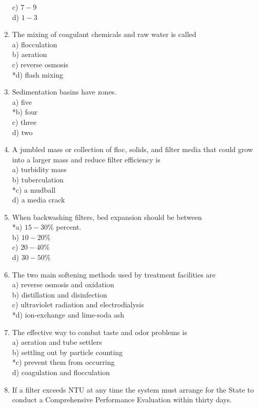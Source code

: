 \begin{enumerate}
c) $7-9$\\
d) $1-3$\\
\item The mixing of coagulant chemicals and raw water is called\\
a) flocculation\\
b) aeration\\
c) reverse osmosis\\
*d) flash mixing\\
\item Sedimentation basins have zones.\\
a) five\\
*b) four\\
c) three\\
d) two\\
\item A jumbled mass or collection of floc, solids, and filter media that could grow into a larger mass and reduce filter efficiency is\\
a) turbidity mass\\
b) tuberculation\\
*c) a mudball\\
d) a media crack\\
\item When backwashing filters, bed expansion should be between\\
*a) $15-30 \%$ percent.\\
b) $10-20 \%$\\
c) $20-40 \%$\\
d) $30-50 \%$\\
\item The two main softening methods used by treatment facilities are\\
a) reverse osmosis and oxidation\\
b) distillation and disinfection\\
c) ultraviolet radiation and electrodialysis\\
*d) ion-exchange and lime-soda ash\\
\item The effective way to combat taste and odor problems is\\
a) aeration and tube settlers\\
b) settling out by particle counting\\
*c) prevent them from occurring\\
d) coagulation and flocculation\\
\item If a filter exceeds NTU at any time the system must arrange for the State to conduct a Comprehensive Performance Evaluation within thirty days.\\

\end{enumerate}
